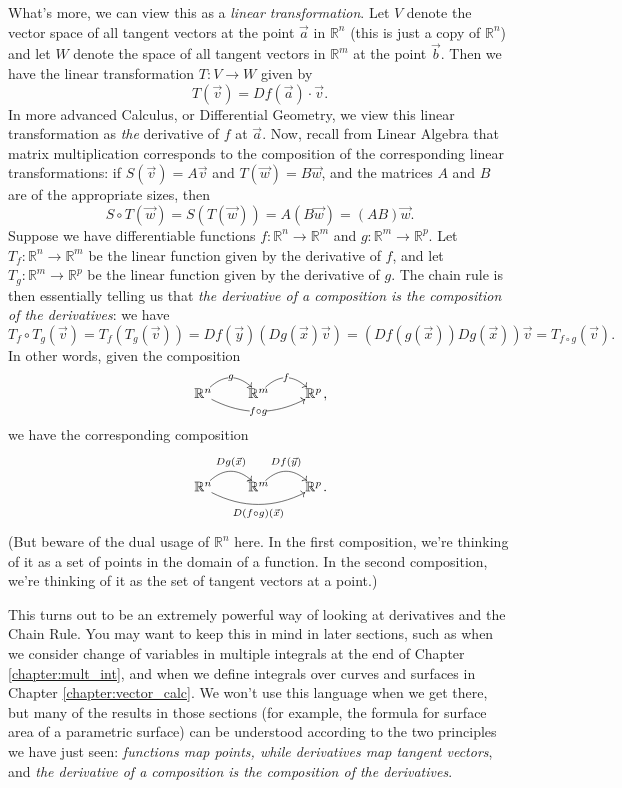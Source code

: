 What's more, we can view this as a \emph{linear transformation}. Let $V$ denote the vector space of all tangent vectors at the point $\vec{a}$ in $\mathbb{R}^n$ (this is just a copy of $\mathbb{R}^n$) and let $W$ denote the space of all tangent vectors in $\mathbb{R}^m$ at the point $\vec{b}$. Then we have the linear transformation $T:V\to W$ given by
\[
T(\vec{v}) = Df(\vec{a})\cdot \vec{v}.
\]
In more advanced Calculus, or Differential Geometry, we view this linear transformation as \emph{the} derivative of $f$ at $\vec{a}$. Now, recall from Linear Algebra that matrix multiplication corresponds to the composition of the corresponding linear transformations: if $S(\vec{v}) = A\vec{v}$ and $T(\vec{w}) = B\vec{w}$, and the matrices $A$ and $B$ are of the appropriate sizes, then
\[
S\circ T(\vec{w}) = S(T(\vec{w}))= A(B\vec{w}) = (AB)\vec{w}.
\]
Suppose we have differentiable functions $f:\mathbb{R}^n\to \mathbb{R}^m$ and $g:\mathbb{R}^m\to \mathbb{R}^p$.
Let $T_f:\mathbb{R}^n\to \mathbb{R}^m$ be the linear function given by the derivative of $f$, and let $T_g:\mathbb{R}^m\to \mathbb{R}^p$ be the linear function given by the derivative of $g$. The chain rule is then essentially telling us that {\em the derivative of a composition is the composition of the derivatives}: we have
\[
 T_f\circ T_g(\vec{v}) = T_f(T_g(\vec{v})) = D f(\vec{y})(D g(\vec{x})\vec{v}) = (D f(g(\vec{x}))D g(\vec{x}))\vec{v} = T_{f\circ g}(\vec{v}).
\]
In other words, given the composition
\[
 \xymatrix@1{\mathbb{R}^n \ar@/^1pc/[r]|g \ar@/_1pc/[rr]|{f\circ g} & \mathbb{R}^m \ar@/^1pc/[r]|f & \mathbb{R}^p},
\]
we have the corresponding composition
\[
 \xymatrix@1{\mathbb{R}^n \ar@/^1pc/[r]^{D g(\vec{x})} \ar@/_1pc/[rr]_{D(f\circ g)(\vec{x})} & \mathbb{R}^m \ar@/^1pc/[r]^{D f(\vec{y})} & \mathbb{R}^p}.
\]
(But beware of the dual usage of $\mathbb{R}^n$ here. In the first composition, we're thinking of it as a set of points in the domain of a function. In the second composition, we're thinking of it as the set of tangent vectors at a point.)

This turns out to be an extremely powerful way of looking at derivatives and the Chain Rule. You may want to keep this in mind in later sections, such as when we consider change of variables in multiple integrals at the end of Chapter \ref{chapter:mult_int}, and when we define integrals over curves and surfaces in Chapter \ref{chapter:vector_calc}. We won't use this language when we get there, but many of the results in those sections (for example, the formula for surface area of a parametric surface) can be understood according to the two principles we have just seen: \emph{functions map points, while derivatives map tangent vectors}, and \emph{the derivative of a composition is the composition of the derivatives}. 


\clearpage{\pagestyle{empty}\cleardoublepage}
